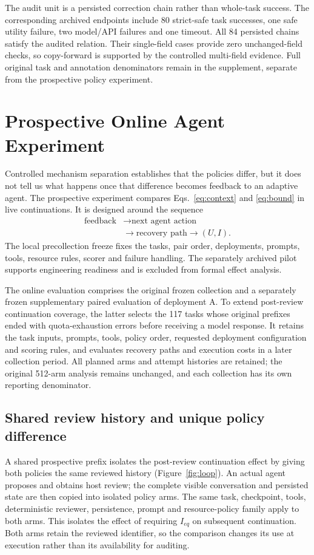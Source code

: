 \documentclass[10pt,a4paper,twocolumn]{article}
\begin{document}
The audit unit is a persisted correction chain rather than whole-task success. The corresponding archived endpoints include 80 strict-safe task successes, one safe utility failure, two model/API failures and one timeout. All 84 persisted chains satisfy the audited relation. Their single-field cases provide zero unchanged-field checks, so copy-forward is supported by the controlled multi-field evidence. Full original task and annotation denominators remain in the supplement, separate from the prospective policy experiment.

\section{Prospective Online Agent Experiment}
Controlled mechanism separation establishes that the policies differ, but it does not tell us what happens once that difference becomes feedback to an adaptive agent. The prospective experiment compares Eqs.~\ref{eq:context} and \ref{eq:bound} in live continuations. It is designed around the sequence
\begin{equation}
\begin{aligned}
\text{feedback}&\to\text{next agent action}\\
&\to\text{recovery path}\to(U,I).
\end{aligned}
\end{equation}
The local precollection freeze fixes the tasks, pair order, deployments, prompts, tools, resource rules, scorer and failure handling. The separately archived pilot supports engineering readiness and is excluded from formal effect analysis.

The online evaluation comprises the original frozen collection and a separately frozen supplementary paired evaluation of deployment A. To extend post-review continuation coverage, the latter selects the 117 tasks whose original prefixes ended with quota-exhaustion errors before receiving a model response. It retains the task inputs, prompts, tools, policy order, requested deployment configuration and scoring rules, and evaluates recovery paths and execution costs in a later collection period. All planned arms and attempt histories are retained; the original 512-arm analysis remains unchanged, and each collection has its own reporting denominator.

\subsection{Shared review history and unique policy difference}
A shared prospective prefix isolates the post-review continuation effect by giving both policies the same reviewed history (Figure~\ref{fig:loop}). An actual agent proposes and obtains host review; the complete visible conversation and persisted state are then copied into isolated policy arms. The same task, checkpoint, tools, deterministic reviewer, persistence, prompt and resource-policy family apply to both arms. This isolates the effect of requiring $I_{eq}$ on subsequent continuation. Both arms retain the reviewed identifier, so the comparison changes its use at execution rather than its availability for auditing.
\end{document}
